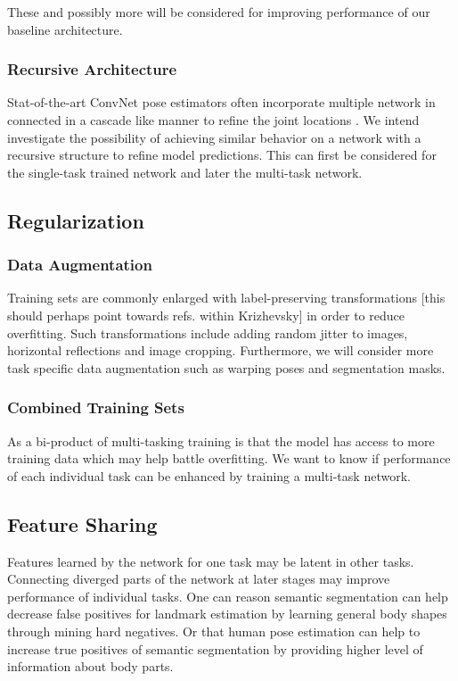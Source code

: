 \documentclass[a4paper,10pt]{article}
\begin{document}
These and possibly more will be considered for improving performance of our baseline architecture.

\subsubsection{Recursive Architecture}
\label{sec:arc:recursive}
Stat-of-the-art ConvNet pose estimators often incorporate multiple network in connected in a cascade like manner  to refine the joint locations \cite{Tompson2015,Wei2016}.  We intend investigate the possibility of achieving similar behavior on a network with a recursive structure to refine model predictions.  This can first be considered for the single-task trained network and later the multi-task network.


\subsection{Regularization}
\label{sec:reg}
\subsubsection{Data Augmentation}
\label{sec:reg:augmentation}
Training sets are commonly enlarged with label-preserving transformations \cite{Krizhevsky2012}[this should perhaps point towards refs. within Krizhevsky] in order to reduce overfitting. Such transformations include adding random jitter to images, horizontal reflections and image cropping.  Furthermore, we will consider more task specific data augmentation such as warping poses and segmentation masks.

\subsubsection{Combined Training Sets}
\label{sec:reg:combined}
As a bi-product of multi-tasking training is that the model has access to more training data which may help battle overfitting.  We want to know if performance of each individual task can be enhanced by training a multi-task network.  

\subsection{Feature Sharing}
Features learned by the network for one task may be latent in other tasks.  Connecting diverged parts of the network at later stages may improve performance of individual tasks.  One can reason semantic segmentation can help decrease false positives for landmark estimation by learning general body shapes through mining hard negatives.  Or that human pose estimation can help to increase true positives of semantic segmentation by providing higher level of information about body parts.
\end{document}
